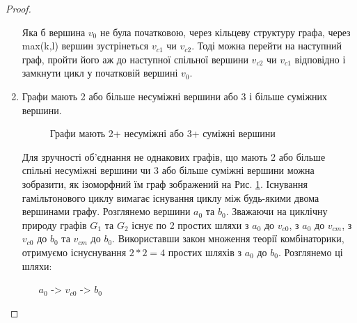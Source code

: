 \documentclass[a4paper,14pt,ukrainian]{extarticle}
\begin{document}
\begin{proof}
\begin{enumerate}
\begin{figure}[h]
                \end{figure}
                Яка б вершина $v_0$ не була початковою, через кільцеву структуру графа, через max(k,l) вершин зустрінеться $v_{c1}$ чи $v_{c2}$.
                Тоді можна перейти на наступний граф, пройти його аж до наступної спільної вершини $v_{c2}$ чи $v_{c1}$ відповідно і замкнути цикл у початковій вершині $v_0$.
            \item Графи мають 2 або більше несуміжні вершини або 3 і більше суміжних вершини.
                \begin{figure}[h]
                    \label{jg2+na3+a}
                    \caption{Графи мають 2+ несуміжні або 3+ суміжні вершини}
                    \centering
                \end{figure}
                Для зручності об’єднання не однакових графів, що мають 2 або більше спільні несуміжні вершини чи 3 або більше суміжні вершини можна зобразити, як ізоморфний їм граф зображений на Рис. \ref{jg2+na3+a}.
                Існування гамільтонового циклу вимагає існування циклу між будь-якими двома вершинами графу.
                Розглянемо вершини $a_0$ та $b_0$.
                Зважаючи на циклічну природу графів $G_1$ та $G_2$ існує по 2 простих шляхи з $a_0$ до $v_{c0}$, з $a_0$ до $v_{cm}$, з $v_{c0}$ до $b_0$ та $v_{cm}$ до $b_0$.
                Використавши закон множення теорії комбінаторики, отримуємо існуснування $2*2=4$ простих шляхів з $a_0$ до $b_0$.
                Розглянемо ці шляхи:
                \begin{enumerate}
                    \item[$a_0$ -> $v_{c0}$ -> $b_0$]
                \end{enumerate}
        \end{enumerate}
    \end{proof}
\end{document}
